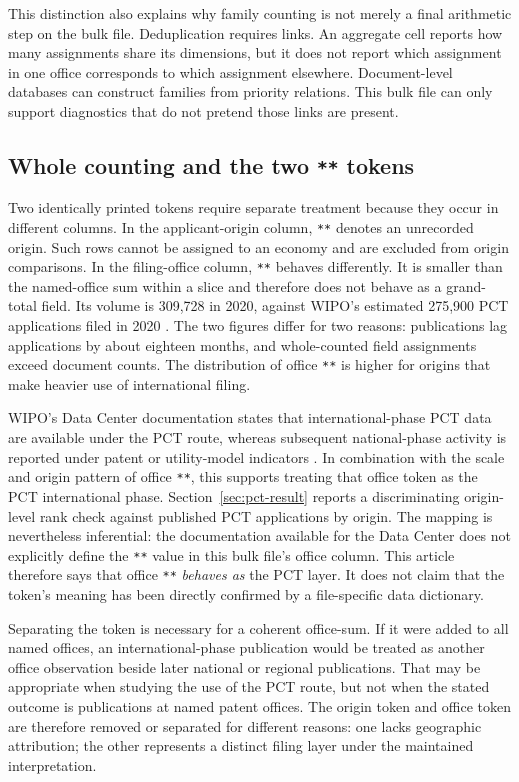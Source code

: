\documentclass[a4paper,fleqn]{cas-dc}
\begin{document}
This distinction also explains why family counting is not merely a final
arithmetic step on the bulk file. Deduplication requires links. An aggregate
cell reports how many assignments share its dimensions, but it does not report
which assignment in one office corresponds to which assignment elsewhere.
Document-level databases can construct families from priority relations.
This bulk file can only support diagnostics that do not pretend those links
are present.

\subsection{Whole counting and the two \texttt{**} tokens}\label{sec:tokens}

Two identically printed tokens require separate treatment because they occur
in different columns. In the applicant-origin column, \texttt{**} denotes an
unrecorded origin. Such rows cannot be assigned to an economy and are excluded
from origin comparisons. In the filing-office column, \texttt{**} behaves
differently. It is smaller than the named-office sum within a slice and
therefore does not behave as a grand-total field. Its volume is 309,728 in
2020, against WIPO's estimated 275,900 PCT applications filed in 2020
\citep{wipo2021pct}. The two figures differ for two reasons: publications lag
applications by about eighteen months, and whole-counted field assignments
exceed document counts. The distribution of office \texttt{**} is higher for
origins that make heavier use of international filing.

WIPO's Data Center documentation states that international-phase PCT data are
available under the PCT route, whereas subsequent national-phase activity is
reported under patent or utility-model indicators \citep{wipoabout}. In
combination with the scale and origin pattern of office \texttt{**}, this
supports treating that office token as the PCT international phase.
Section~\ref{sec:pct-result} reports a discriminating origin-level rank check
against published PCT applications by origin. The mapping is nevertheless
inferential: the documentation available for the Data Center does not
explicitly define the \texttt{**} value in this bulk file's office column.
This article therefore says that office \texttt{**} \emph{behaves as} the PCT
layer. It does not claim that the token's meaning has been directly confirmed
by a file-specific data dictionary.

Separating the token is necessary for a coherent office-sum. If it were added
to all named offices, an international-phase publication would be treated as
another office observation beside later national or regional publications.
That may be appropriate when studying the use of the PCT route, but not when
the stated outcome is publications at named patent offices. The origin token
and office token are therefore removed or separated for different reasons:
one lacks geographic attribution; the other represents a distinct filing
layer under the maintained interpretation.
\end{document}
